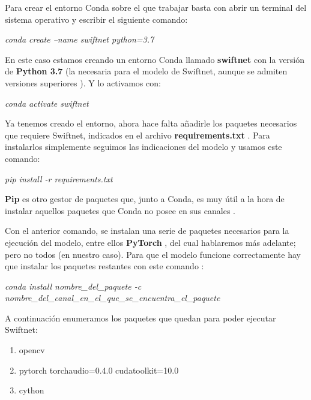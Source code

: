 Para crear el entorno Conda sobre el que trabajar basta con abrir un terminal del sistema operativo y escribir el siguiente comando:

\begin{center}
\textit{conda create --name swiftnet python=3.7}
\end{center}

En este caso estamos creando un entorno Conda llamado \textbf{swiftnet} con la versión de \textbf{Python 3.7} (la necesaria para el modelo de Swiftnet, aunque se admiten versiones superiores  \cite{github_swiftnet}). Y lo activamos con:

\begin{center}
\textit{conda activate swiftnet}
\end{center}

Ya tenemos creado el entorno, ahora hace falta añadirle los paquetes necesarios que requiere Swiftnet, indicados en el archivo \textbf{requirements.txt} \cite{github_swiftnet}. Para instalarlos simplemente seguimos las indicaciones del modelo y usamos este comando:

\begin{center}
\textit{pip install -r requirements.txt}
\end{center}

\textbf{Pip} es otro gestor de paquetes que, junto a Conda, es muy útil a la hora de instalar aquellos paquetes que Conda no posee en sus canales \cite{pip}.

Con el anterior comando, se instalan una serie de paquetes necesarios para la ejecución del modelo, entre ellos \textbf{PyTorch} \cite{pytorch}, del cual hablaremos más adelante; pero no todos (en nuestro caso). Para que el modelo funcione correctamente hay que instalar los paquetes restantes con este comando \cite{conda_sheet}:

\begin{center}
\textit{conda install nombre\_del\_paquete -c nombre\_del\_canal\_en\_el\_que\_se\_encuentra\_el\_paquete}
\end{center}

A continuación enumeramos los paquetes que quedan para poder ejecutar Swiftnet:

\begin{enumerate}
\item opencv \cite{opencv}
\item pytorch torchaudio=0.4.0 cudatoolkit=10.0 \cite{pytorch}
\item cython
\end{enumerate}

